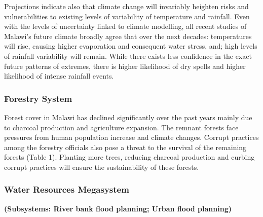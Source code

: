 \documentclass[
]{book}
\begin{document}
Projections indicate also that climate change will invariably heighten risks and vulnerabilities to existing levels of variability of temperature and rainfall.
Even with the levels of uncertainty linked to climate modelling, all recent studies of Malawi's future climate broadly agree that over the next decades:
temperatures will rise, causing higher evaporation and consequent water stress, and; high levels of rainfall variability will remain. While there exists less
confidence in the exact future patterns of extremes, there is higher likelihood of dry spells and higher likelihood of intense rainfall events.

\hypertarget{forestry-system}{%
\subsubsection{Forestry System}\label{forestry-system}}

Forest cover in Malawi has declined significantly over the past years mainly due to charcoal production and agriculture expansion. The remnant forests face
pressures from human population increase and climate changes. Corrupt practices among the forestry officials also pose a threat to the survival of the remaining
forests (Table 1). Planting more trees, reducing charcoal production and curbing corrupt practices will ensure the sustainability of these forests.

\hypertarget{water-resources-megasystem}{%
\subsubsection{Water Resources Megasystem}\label{water-resources-megasystem}}

\textbf{(Subsystems: River bank flood planning; Urban flood planning)}
\end{document}
